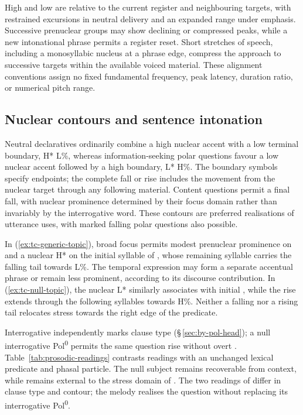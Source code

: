 High and low are relative to the current register and neighbouring targets,
with restrained excursions in neutral delivery and an expanded range under
emphasis. Successive prenuclear groups may show declining or compressed
peaks, while a new intonational phrase permits a register reset. Short
stretches of speech, including a monosyllabic nucleus at a phrase edge,
compress the approach to successive targets within the available voiced
material. These alignment conventions assign no fixed fundamental
frequency, peak latency, duration ratio, or numerical pitch range.

\subsection{Nuclear contours and sentence intonation}\label{sec:intonation}

Neutral declaratives ordinarily combine a high nuclear accent with a low
terminal boundary, H* L\%, whereas information-seeking polar questions
favour a low nuclear accent followed by a high boundary, L* H\%. The
boundary symbols specify endpoints; the complete fall or rise includes
the movement from the nuclear target through any following material.
Content questions permit a final fall, with nuclear prominence determined
by their focus domain rather than invariably by the interrogative word.
These contours are preferred realisations of utterance uses, with marked
falling polar questions also possible.

In  
(\ref{ex:tc-generic-topic}), broad focus permits modest prenuclear
prominence on  and a nuclear H* on the initial syllable of
, whose remaining syllable carries the falling tail towards
L\%. The temporal expression may form a separate accentual phrase or
remain less prominent, according to its discourse contribution. In
 
(\ref{ex:tc-null-topic}), the nuclear L* similarly associates with initial
, while the rise extends through the following syllables towards
H\%. Neither a falling nor a rising tail relocates stress towards the
right edge of the predicate.

Interrogative  independently marks clause type
(§\,\ref{sec:by-pol-head}); a null interrogative
Pol\textsuperscript{0} permits the same question rise without overt
. Table~\ref{tab:prosodic-readings} contrasts readings with an
unchanged lexical predicate and phasal particle. The null subject remains
recoverable from context, while  remains external to the stress
domain of . The two readings of  differ in
clause type and contour; the melody realises the question without replacing
its interrogative Pol\textsuperscript{0}.

